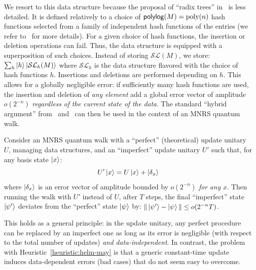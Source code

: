 We resort to this data structure because the proposal of ``radix trees'' in~\cite{DBLP:conf/pqcrypto/BernsteinJLM13} is less detailed. It is defined relatively to a choice of $\mathsf{polylog}(M) = \operatorname{poly}(n)$ hash functions selected from a family of independent hash functions of the entries (we refer to~\cite{DBLP:journals/siamcomp/Ambainis07} for more details). For a given choice of hash functions, the insertion or deletion operations can fail. Thus, the data structure is equipped with a superposition of such choices. Instead of storing $\mathcal{SL}(M)$, we store: $\sum_h \left| h \right\rangle \left| \mathcal{SL}_h(M) \right\rangle$ where $\mathcal{SL}_h$ is the data structure flavored with the choice of hash functions $h$. Insertions and deletions are performed depending on $h$. This allows for a globally negligible error: if sufficiently many hash functions are used, the insertion and deletion of \emph{any element} add a global error vector of amplitude $o(2^{-n})$ \emph{regardless of the current state of the data}. The standard ``hybrid argument'' from~\cite{DBLP:journals/siamcomp/BennettBBV97} and~\cite[Lemma 5]{DBLP:journals/siamcomp/Ambainis07} can then be used in the context of an MNRS quantum walk. %

\begin{proposition}
Consider an MNRS quantum walk with a ``perfect'' (theoretical) update unitary $U$, managing data structures, and an ``imperfect'' update unitary $U'$ such that, for any basis state $\left| x \right\rangle$:
$$ U' \left| x \right\rangle = U \left| x \right\rangle + \left| \delta_x \right\rangle  $$
where $\left| \delta_x \right\rangle$ is an error vector of amplitude bounded by $o(2^{-n})$ \emph{for any $x$}. Then running the walk with $U'$ instead of $U$, after $T$ steps, the final ``imperfect'' state $\left| \psi' \right\rangle$ deviates from the ``perfect'' state $\left| \psi \right\rangle$ by: $\| \left| \psi' \right\rangle - \left| \psi \right\rangle \| \leq o(2^{-n} T) $.
\end{proposition}

This holds as a general principle: in the update unitary, any perfect procedure can be replaced by an imperfect one as long as its error is negligible (with respect to the total number of updates) \emph{and data-independent}. In contrast, the problem with Heuristic~\ref{heuristic:helm-may} is that a generic constant-time update induces data-dependent errors (bad cases) that do not seem easy to overcome.




